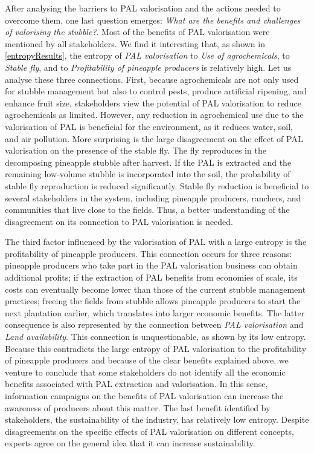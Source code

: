 After analysing the barriers to PAL valorisation and the actions needed to overcome them, one last question emerges: \textit{What are the benefits and challenges of valorising the stubble?}. Most of the benefits of PAL valorisation were mentioned by all stakeholders. We find it interesting that, as shown in \cref{entropyResults}, the entropy of \textit{PAL valorisation} to \textit{Use of agrochemicals}, to \textit{Stable fly}, and to \textit{Profitability of pineapple producers} is relatively high. Let us analyse these three connections. First, because agrochemicals are not only used for stubble management but also to control pests, produce artificial ripening, and enhance fruit size, stakeholders view the potential of PAL valorisation to reduce agrochemicals as limited. However, any reduction in agrochemical use due to the valorisation of PAL is beneficial for the environment, as it reduces water, soil, and air pollution. More surprising is the large disagreement on the effect of PAL valorisation on the presence of the stable fly. The fly reproduces in the decomposing pineapple stubble after harvest. If the PAL is extracted and the remaining low-volume stubble is incorporated into the soil, the probability of stable fly reproduction is reduced significantly. Stable fly reduction is beneficial to several stakeholders in the system, including pineapple producers, ranchers, and communities that live close to the fields. Thus, a better understanding of the disagreement on its connection to PAL valorisation is needed. 

The third factor influenced by the valorisation of PAL with a large entropy is the profitability of pineapple producers. This connection occurs for three reasons: pineapple producers who take part in the PAL valorisation business can obtain additional profits; if the extraction of PAL benefits from economies of scale, its costs can eventually become lower than those of the current stubble management practices; freeing the fields from stubble allows pineapple producers to start the next plantation earlier, which translates into larger economic benefits. The latter consequence is also represented by the connection between \textit{PAL valorisation} and \textit{Land availability}. This connection is unquestionable, as shown by its low entropy. Because this contradicts the large entropy of PAL valorisation to the profitability of pineapple producers and because of the clear benefits explained above, we venture to conclude that some stakeholders do not identify all the economic benefits associated with PAL extraction and valorisation. In this sense, information campaigns on the benefits of PAL valorisation can increase the awareness of producers about this matter. The last benefit identified by stakeholders, the sustainability of the industry, has relatively low entropy. Despite disagreements on the specific effects of PAL valorisation on different concepts, experts agree on the general idea that it can increase sustainability. 

